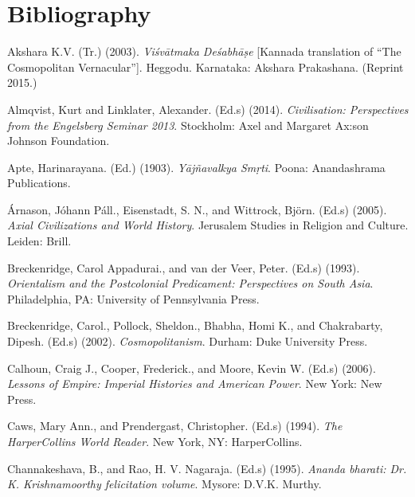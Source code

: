 
\chapter{Bibliography}

\item Akshara K.V. (Tr.) (2003). \textit{Viśvātmaka Deśabhāṣe} [Kannada translation of “The Cosmopolitan Vernacular”]. Heggodu. Karnataka: Akshara Prakashana. (Reprint 2015.)

 \item Almqvist, Kurt and Linklater, Alexander. (Ed.s) (2014).\textit{ Civilisation: Perspectives from the Engelsberg Seminar 2013}. Stockholm: Axel and Margaret Ax:son Johnson Foundation.

 \item Apte, Harinarayana. (Ed.) (1903). \textit{Yājñavalkya Smṛti}. Poona: Anandashrama Publications.

 \item Árnason, Jóhann Páll., Eisenstadt, S. N., and Wittrock, Björn. (Ed.s) (2005). \textit{Axial Civilizations and World History}. Jerusalem Studies in Religion and Culture. Leiden: Brill.

 \item Breckenridge, Carol Appadurai., and van der Veer, Peter. (Ed.s) (1993). \textit{Orientalism and the Postcolonial Predicament: Perspectives on South Asia}. Philadelphia, PA: University of Pennsylvania Press.

 \item Breckenridge, Carol., Pollock, Sheldon., Bhabha, Homi K., and Chakrabarty, Dipesh. (Ed.s) (2002). \textit{Cosmopolitanism}. Durham: Duke University Press.

 \item Calhoun, Craig J., Cooper, Frederick., and Moore, Kevin W. (Ed.s) (2006). \textit{Lessons of Empire: Imperial Histories and American Power}. New York: New Press.

 \item Caws, Mary Ann., and Prendergast, Christopher. (Ed.s) (1994).\textit{ The HarperCollins World Reader}. New York, NY: HarperCollins.

 \item Channakeshava, B., and Rao, H. V. Nagaraja. (Ed.s) (1995). \textit{Ananda bharati: Dr. K. Krishnamoorthy felicitation volume}. Mysore: D.V.K. Murthy.

